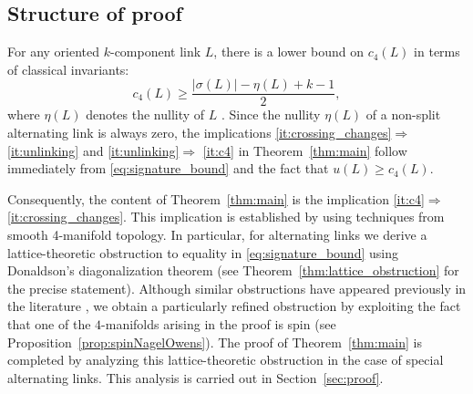 \documentclass[a4paper,11pt]{amsart}
\newtheorem{cor}[thm]{Corollary}
\theoremstyle{definition}
\theoremstyle{remark}
\numberwithin{equation}{section}
\begin{document}


 \subsection*{Structure of proof}
For any oriented $k$-component link $L$, there is a lower bound on $c_4(L)$ in terms of classical invariants:
\begin{equation}\label{eq:signature_bound}
    c_4(L)\geq \frac{|\sigma(L)|-\eta(L)+k-1}{2},
\end{equation}
where $\eta(L)$ denotes the nullity of $L$ \cite[Lemma 2.2]{NagelOwens}. Since the nullity $\eta(L)$ of a non-split alternating link is always zero, the implications \eqref{it:crossing_changes}$\Rightarrow$\eqref{it:unlinking} and \eqref{it:unlinking}$\Rightarrow$ \eqref{it:c4} in Theorem~\ref{thm:main} follow immediately from \eqref{eq:signature_bound} and the fact that $u(L)\geq c_4(L)$. 

Consequently, the content of Theorem~\ref{thm:main} is the implication \eqref{it:c4}$\Rightarrow$\eqref{it:crossing_changes}. This implication is established by using techniques from smooth 4-manifold topology. In particular, for alternating links we derive a lattice-theoretic obstruction to equality in \eqref{eq:signature_bound} using Donaldson's diagonalization theorem \cite{Donaldson:1987-1} (see Theorem~\ref{thm:lattice_obstruction} for the precise statement). Although similar obstructions have appeared previously in the literature \cite{NagelOwens, Feller2016twobridge, Owens2010slicing}, we obtain a particularly refined obstruction by exploiting the fact that one of the $4$-manifolds arising in the proof is spin (see Proposition~\ref{prop:spinNagelOwens}). The proof of Theorem~\ref{thm:main} is completed by analyzing this lattice-theoretic obstruction in the case of special alternating links. This analysis is carried out in Section~\ref{sec:proof}.
\end{document}

